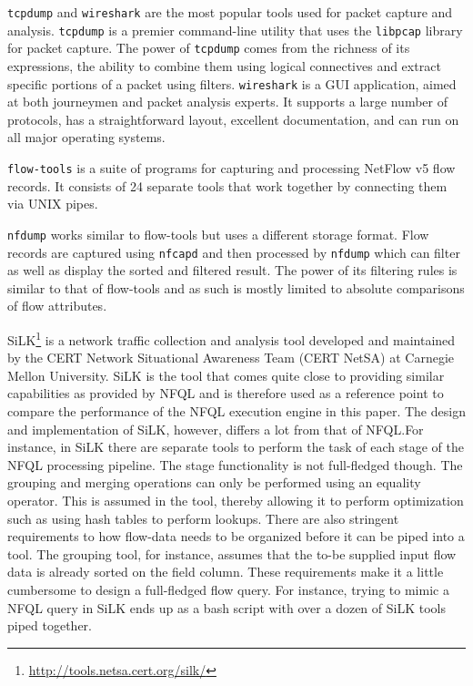 \texttt{tcpdump} and \texttt{wireshark} are the most popular tools used for
packet capture and analysis. \texttt{tcpdump} \cite{tcpdump-manpage} is a
premier command-line utility that uses the \texttt{libpcap}
\cite{pcap-manpage} library for packet capture. The power of \texttt{tcpdump}
comes from the richness of its expressions, the ability to combine them using
logical connectives and extract specific portions of a packet using filters.
\texttt{wireshark} \cite{wireshark-manpage} is a GUI application, aimed at
both journeymen and packet analysis experts. It supports a large number of
protocols, has a straightforward layout, excellent documentation, and can run
on all major operating systems.

\texttt{flow-tools} \cite{sromig:2000} is a suite of programs for capturing
and processing NetFlow v5 flow records. It consists of 24 separate tools that
work together by connecting them via UNIX pipes. 

\texttt{nfdump} \cite{phaag:2006} works similar to flow-tools but uses a
different storage format. Flow records are captured using \texttt{nfcapd} and
then processed by \texttt{nfdump} which can filter as well as display the
sorted and filtered result. The power of its filtering rules is similar to
that of flow-tools and as such is mostly limited to absolute comparisons of
flow attributes.

SiLK\footnote{\url{http://tools.netsa.cert.org/silk/}} is a network traffic
collection and analysis tool developed and maintained by the CERT Network
Situational Awareness Team (CERT NetSA) at Carnegie Mellon University. SiLK is
the tool that comes quite close to providing similar capabilities as provided
by \ac{NFQL} and is therefore used as a reference point to compare the
performance of the \ac{NFQL} execution engine in this paper. The design and
implementation of SiLK, however, differs a lot from that of \ac{NFQL}.For
instance, in SiLK there are separate tools to perform the task of each stage
of the \ac{NFQL} processing pipeline. The stage functionality is not
full-fledged though. The grouping and merging operations can only be performed
using an equality operator. This is assumed in the tool, thereby allowing it
to perform optimization such as using hash tables to perform lookups. There
are also stringent requirements to how flow-data needs to be organized before
it can be piped into a tool. The grouping tool, for instance, assumes that the
to-be supplied input flow data is already sorted on the field column.  These
requirements make it a little cumbersome to design a full-fledged flow query.
For instance, trying to mimic a \ac{NFQL} query in SiLK ends up as a bash
script with over a dozen of SiLK tools piped together.
